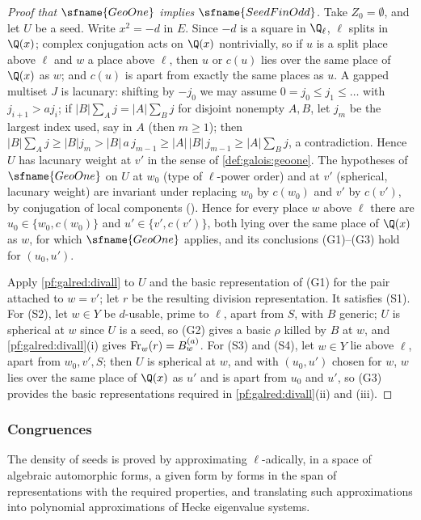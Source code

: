 \begin{proof}[Proof that $\sfname{GeoOne}$ implies $\sfname{SeedFinOdd}$]
Take $Z_0=\emptyset$, and let $U$ be a seed. Write $x^2=-d$ in $E$. Since $-d$ is a square in $\Q_\ell$, $\ell$ splits in
$\Q(x)$; complex conjugation acts on $\Q(x)$ nontrivially, so if $u$ is a split place above $\ell$ and $w$ a place above
$\ell$, then $u$ or $c(u)$ lies over the same place of $\Q(x)$ as $w$; and $c(u)$ is apart from exactly the same places as $u$.
A gapped multiset $J$ is lacunary: shifting by $-j_0$ we may assume $0=j_0\le j_1\le\dots$ with $j_{i+1}>aj_i$; if
$|B|\sum_Aj=|A|\sum_Bj$ for disjoint nonempty $A,B$, let $j_m$ be the largest index used, say in $A$ (then $m\ge1$); then
$|B|\sum_Aj\ge|B|j_m>|B|\,a\,j_{m-1}\ge|A|\,|B|\,j_{m-1}\ge|A|\sum_Bj$, a contradiction. Hence $U$ has lacunary weight at $v'$
in the sense of \cref{def:galois:geoone}. The hypotheses of $\sfname{GeoOne}$ on $U$ at $w_0$ (type of $\ell$-power order) and
at $v'$ (spherical, lacunary weight) are invariant under replacing $w_0$ by $c(w_0)$ and $v'$ by $c(v')$, by conjugation of
local components (). Hence for every place $w$ above $\ell$ there are $u_0\in\{w_0,c(w_0)\}$ and
$u'\in\{v',c(v')\}$, both lying over the same place of $\Q(x)$ as $w$, for which $\sfname{GeoOne}$ applies, and its conclusions
(G1)--(G3) hold for $(u_0,u')$.

Apply \cref{pf:galred:divall} to $U$ and the basic representation of (G1) for the pair attached to $w=v'$; let $r$ be the
resulting division representation. It satisfies (S1). For (S2), let $w\in Y$ be $d$-usable, prime to $\ell$, apart from $S$,
with $B$ generic; $U$ is spherical at $w$ since $U$ is a seed, so (G2) gives a basic $\rho$ killed by $B$ at $w$, and
\cref{pf:galred:divall}(i) gives $\operatorname{Fr}_w(r)=B^{(a)}_w$. For (S3) and (S4), let $w\in Y$ lie above $\ell$, apart from
$w_0,v',S$; then $U$ is spherical at $w$, and with $(u_0,u')$ chosen for $w$, $w$ lies over the same place of $\Q(x)$ as
$u'$ and is apart from $u_0$ and $u'$, so (G3) provides the basic representations required in
\cref{pf:galred:divall}(ii) and (iii).
\end{proof}

\subsubsection{Congruences}\label{sec:pf:galred:cong}

The density of seeds is proved by approximating $\ell$-adically, in a space of algebraic automorphic forms, a given form by
forms in the span of representations with the required properties, and translating such approximations into polynomial
approximations of Hecke eigenvalue systems.

